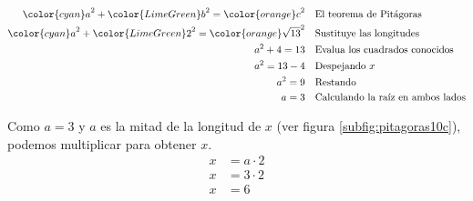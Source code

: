 \begin{solutionbox}{10.5cm}
    \begin{minipage}{0.45\linewidth}
        \begin{align*}
            {\color{cyan}a}^2+{\color{LimeGreen}b}^2  ={\color{orange}c}^2         & \text{\quad El teorema de Pitágoras}           \\
            {\color{cyan}a}^2+{\color{LimeGreen}2}^2  ={\color{orange}\sqrt{13}}^2 & \text{\quad Sustituye las longitudes}          \\
            a^2+4   =13                                                            & \text{\quad Evalua los cuadrados conocidos}    \\
            a^2=13-4                                                               & \text{\quad Despejando } x                     \\
            a^2=9                                                                  & \text{\quad Restando}                          \\
            a=3                                                                    & \text{\quad Calculando la raíz en ambos lados}
        \end{align*}
    \end{minipage}%
    \begin{minipage}{0.45\linewidth}
        Como $a=3$ y $a$ es la mitad de la longitud de $x$ (ver figura \ref{subfig:pitagoras10c}), podemos multiplicar para obtener $x$.
        \begin{align*}
            x & = a\cdot 2 \\
            x & = 3\cdot 2 \\
            x & = 6
        \end{align*}
    \end{minipage}
\end{solutionbox}
